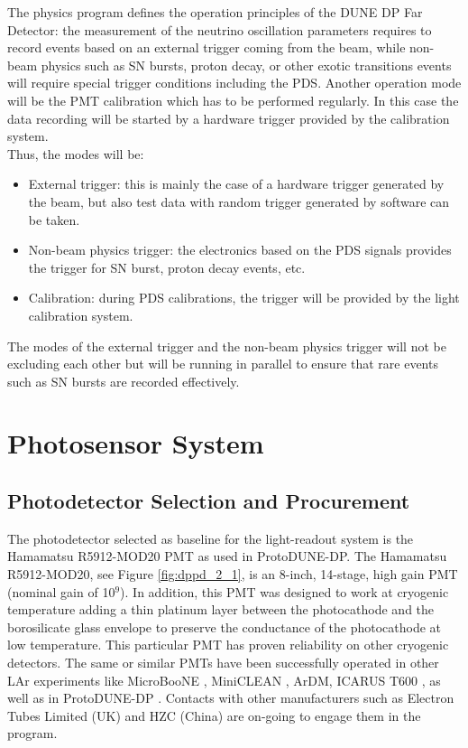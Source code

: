 The physics program defines the operation principles of the DUNE DP Far Detector: the measurement of the neutrino oscillation parameters requires to record events based on an external trigger coming from the beam, while non-beam physics such as SN bursts, proton decay, or other exotic transitions events will require special trigger conditions including the PDS. Another operation mode will be the PMT calibration which has to be performed regularly. In this case the data recording will be started by a hardware trigger provided by the calibration system. \\    

Thus, the modes will be:
\begin{itemize}
\item External trigger: this is mainly the case of a hardware trigger generated by the beam, but also test data with random trigger generated by software can be taken. 
\item Non-beam physics trigger: the electronics based on the PDS signals provides the trigger for SN burst, proton decay events, etc.
\item Calibration: during PDS calibrations, the trigger will be provided by the light calibration system.
\end{itemize}

The modes of the external trigger and the non-beam physics trigger will not be excluding each other but will be running in parallel to ensure that rare events such as SN bursts are recorded effectively.

\section{Photosensor System}
\label{sec:fddp-pd-2}

\subsection{Photodetector Selection and Procurement}
\label{sec:fddp-pd-2.1}

The photodetector selected as baseline for the light-readout system is the Hamamatsu R5912-MOD20 PMT as used in ProtoDUNE-DP. The Hamamatsu R5912-MOD20, see Figure \ref{fig:dppd_2_1}, is an 8-inch, 14-stage, high gain PMT (nominal gain of \num{10}$^9$). In addition, this PMT was designed to work at cryogenic temperature adding a thin platinum layer between the photocathode and the borosilicate glass envelope to preserve the conductance of the photocathode at low temperature. This particular PMT has proven reliability on other cryogenic detectors. The same or similar PMTs have been successfully operated in other LAr experiments like MicroBooNE \cite{microboone}, MiniCLEAN \cite{miniclean}, ArDM, ICARUS T600 \cite{icarus}, as well as in ProtoDUNE-DP \cite{protoDUNDP-tdr}. Contacts with other manufacturers such as Electron Tubes Limited (UK) \cite{electrontubeslim} and HZC (China) \cite{hzc} are on-going to engage them in the program.


